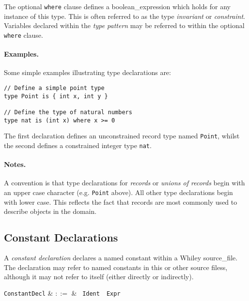 The optional \lstinline{where} clause defines a
\gls{boolean_expression} which holds for any instance of this type.
This is often referred to as the type {\em invariant} or {\em
  constraint}.  Variables declared within the {\em type pattern} may be
referred to within the optional \lstinline{where} clause.

\paragraph{Examples.}  Some simple examples illustrating type
declarations are:

\begin{lstlisting}
// Define a simple point type
type Point is { int x, int y }

// Define the type of natural numbers
type nat is (int x) where x >= 0
\end{lstlisting}

The first declaration defines an unconstrained record type named
\lstinline{Point}, whilst the second defines a constrained integer
type \lstinline{nat}.

\paragraph{Notes.}  A convention is that type declarations for {\em
  records} or {\em unions of records} begin with an upper case
character (e.g. \lstinline{Point} above).  All other type declarations
begin with lower case.  This reflects the fact that records are most
commonly used to describe objects in the domain.


\subsection{Constant Declarations}

A {\em constant declaration} declares a named constant within a Whiley
\gls{source_file}.  The declaration may refer to named constants in this
or other source filess, although it may not refer to itself (either
directly or indirectly).

\begin{syntax}
  \verb+ConstantDecl+ & $::=$ & \ \verb+Ident+\
  \ \verb+Expr+\\
\end{syntax}

